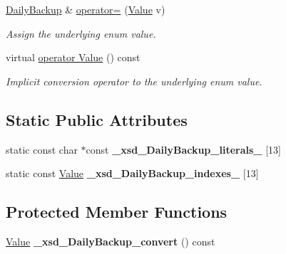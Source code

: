 \begin{DoxyCompactItemize}
\hyperlink{classopenstack_1_1xml_1_1DailyBackup}{DailyBackup} \& \hyperlink{classopenstack_1_1xml_1_1DailyBackup_ac2774bf63c7676b5a079d9807b55a562}{operator=} (\hyperlink{classopenstack_1_1xml_1_1DailyBackup_a61da52f27012e476ed49b709f9408add}{Value} v)
\begin{DoxyCompactList}\small\item\em Assign the underlying enum value. \item\end{DoxyCompactList}\item 
virtual \hyperlink{classopenstack_1_1xml_1_1DailyBackup_afc4d09a611cd5d784ffd3f56014dec7a}{operator Value} () const 
\begin{DoxyCompactList}\small\item\em Implicit conversion operator to the underlying enum value. \item\end{DoxyCompactList}\end{DoxyCompactItemize}
\subsection*{Static Public Attributes}
\begin{DoxyCompactItemize}
\item 
\hypertarget{classopenstack_1_1xml_1_1DailyBackup_a2cee427687a8a9f384d2370caccb1acb}{
static const char $\ast$const {\bfseries \_\-xsd\_\-DailyBackup\_\-literals\_\-} \mbox{[}13\mbox{]}}
\label{classopenstack_1_1xml_1_1DailyBackup_a2cee427687a8a9f384d2370caccb1acb}

\item 
\hypertarget{classopenstack_1_1xml_1_1DailyBackup_aa74e0e173a904e8b743e6c636b3fe62b}{
static const \hyperlink{classopenstack_1_1xml_1_1DailyBackup_a61da52f27012e476ed49b709f9408add}{Value} {\bfseries \_\-xsd\_\-DailyBackup\_\-indexes\_\-} \mbox{[}13\mbox{]}}
\label{classopenstack_1_1xml_1_1DailyBackup_aa74e0e173a904e8b743e6c636b3fe62b}

\end{DoxyCompactItemize}
\subsection*{Protected Member Functions}
\begin{DoxyCompactItemize}
\item 
\hypertarget{classopenstack_1_1xml_1_1DailyBackup_ac76b899c3c77508e1434e3e6649c99a0}{
\hyperlink{classopenstack_1_1xml_1_1DailyBackup_a61da52f27012e476ed49b709f9408add}{Value} {\bfseries \_\-xsd\_\-DailyBackup\_\-convert} () const }
\label{classopenstack_1_1xml_1_1DailyBackup_ac76b899c3c77508e1434e3e6649c99a0}

\end{DoxyCompactItemize}


